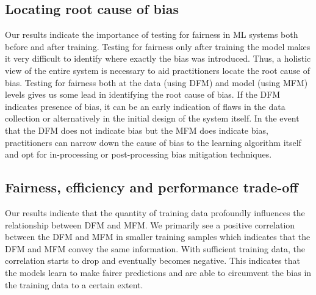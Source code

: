 \documentclass{article}
\begin{document}


\subsection{Locating root cause of bias}\label{sec:discuss-root-cause-bias}

Our results indicate the importance of testing for fairness in ML
systems both before and after training. Testing for fairness only
after training the model makes it very difficult to identify where
exactly the bias was introduced. Thus, a holistic view of the entire
system is necessary to aid practitioners locate the root cause of
bias. Testing for fairness both at the data (using DFM) and model
(using MFM) levels gives us some lead in identifying the root cause of
bias. If the DFM indicates presence of bias, it can be an early
indication of flaws in the data collection or alternatively in the
initial design of the system itself. In the event that the DFM does
not indicate bias but the MFM does indicate bias, practitioners can
narrow down the cause of bias to the learning algorithm itself and opt
for in-processing or post-processing bias mitigation techniques.



\subsection{Fairness, efficiency and performance trade-off}\label{sec:discuss-fair-eff-perf-trade}

Our results indicate that the quantity of training data profoundly
influences the relationship between DFM and MFM. We primarily see a
positive correlation between the DFM and MFM in smaller training
samples which indicates that the DFM and MFM convey the same
information. With sufficient training data, the correlation starts to
drop and eventually becomes negative. This indicates that the models
learn to make fairer predictions and are able to circumvent the bias
in the training data to a certain extent.
\end{document}
